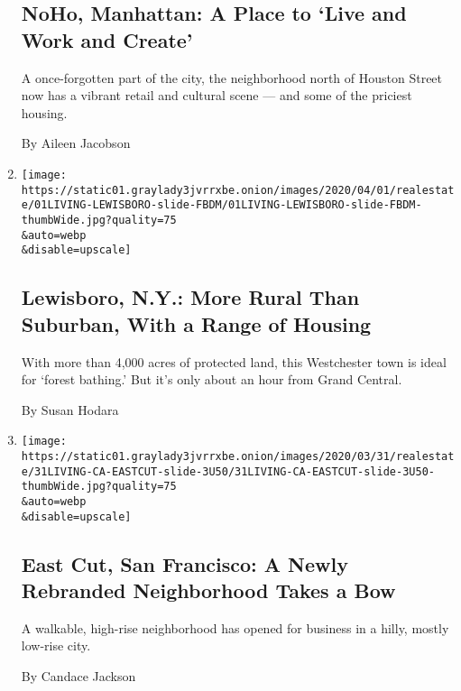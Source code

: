 \begin{enumerate}
{  \subsection{NoHo, Manhattan: A Place to `Live and Work and
  Create'}\label{noho-manhattan-a-place-to-live-and-work-and-create}}

  A once-forgotten part of the city, the neighborhood north of Houston
  Street now has a vibrant retail and cultural scene --- and some of the
  priciest housing.

  By Aileen Jacobson
\item
  \href{/2020/04/01/realestate/lewisboro-ny-more-rural-than-suburban-with-a-range-of-housing.html}{}

  \texttt{[image: https://static01.graylady3jvrrxbe.onion/images/2020/04/01/realestate/01LIVING-LEWISBORO-slide-FBDM/01LIVING-LEWISBORO-slide-FBDM-thumbWide.jpg?quality=75\\\&auto=webp\\\&disable=upscale]}

  \hypertarget{lewisboro-ny-more-rural-than-suburban-with-a-range-of-housing}{%
  \subsection{Lewisboro, N.Y.: More Rural Than Suburban, With a Range of
  Housing}\label{lewisboro-ny-more-rural-than-suburban-with-a-range-of-housing}}

  With more than 4,000 acres of protected land, this Westchester town is
  ideal for `forest bathing.' But it's only about an hour from Grand
  Central.

  By Susan Hodara
\item
  \href{/2020/03/31/realestate/east-cut-san-francisco-a-newly-rebranded-neighborhood-takes-a-bow.html}{}

  \texttt{[image: https://static01.graylady3jvrrxbe.onion/images/2020/03/31/realestate/31LIVING-CA-EASTCUT-slide-3U50/31LIVING-CA-EASTCUT-slide-3U50-thumbWide.jpg?quality=75\\\&auto=webp\\\&disable=upscale]}

  \hypertarget{east-cut-san-francisco-a-newly-rebranded-neighborhood-takes-a-bow}{%
  \subsection{East Cut, San Francisco: A Newly Rebranded Neighborhood
  Takes a
  Bow}\label{east-cut-san-francisco-a-newly-rebranded-neighborhood-takes-a-bow}}

  A walkable, high-rise neighborhood has opened for business in a hilly,
  mostly low-rise city.

  By Candace Jackson
\end{enumerate}

